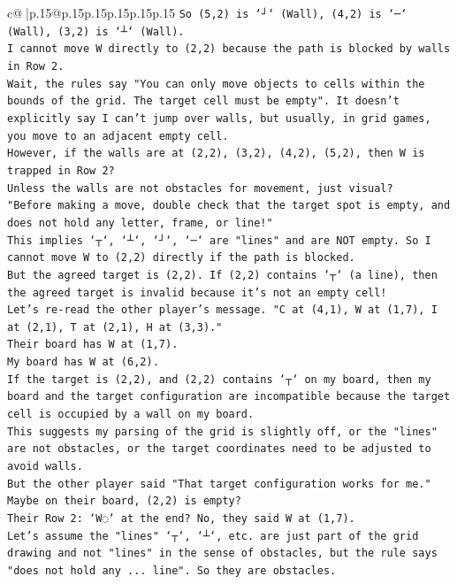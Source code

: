 \documentclass{article}
\begin{document}
{\begin{supertabular}{c@{$\;$}|p{.15\linewidth}@{}p{.15\linewidth}p{.15\linewidth}p{.15\linewidth}p{.15\linewidth}p{.15\linewidth}}
{{{\texttt{So (5,2) is `┘` (Wall), (4,2) is `─` (Wall), (3,2) is `┴` (Wall).} \\
\texttt{I cannot move W directly to (2,2) because the path is blocked by walls in Row 2.} \\
\texttt{Wait, the rules say "You can only move objects to cells within the bounds of the grid. The target cell must be empty". It doesn't explicitly say I can't jump over walls, but usually, in grid games, you move to an adjacent empty cell.} \\
\texttt{However, if the walls are at (2,2), (3,2), (4,2), (5,2), then W is trapped in Row 2?} \\
\texttt{Unless the walls are not obstacles for movement, just visual?} \\
\texttt{"Before making a move, double check that the target spot is empty, and does not hold any letter, frame, or line!"} \\
\texttt{This implies `┬`, `┴`, `┘`, `─` are "lines" and are NOT empty. So I cannot move W to (2,2) directly if the path is blocked.} \\
\texttt{But the agreed target is (2,2). If (2,2) contains `┬` (a line), then the agreed target is invalid because it's not an empty cell!} \\
\texttt{Let's re{-}read the other player's message. "C at (4,1), W at (1,7), I at (2,1), T at (2,1), H at (3,3)."} \\
\texttt{Their board has W at (1,7).} \\
\texttt{My board has W at (6,2).} \\
\texttt{If the target is (2,2), and (2,2) contains `┬` on my board, then my board and the target configuration are incompatible because the target cell is occupied by a wall on my board.} \\
\texttt{This suggests my parsing of the grid is slightly off, or the "lines" are not obstacles, or the target coordinates need to be adjusted to avoid walls.} \\
\texttt{But the other player said "That target configuration works for me."} \\
\texttt{Maybe on their board, (2,2) is empty?} \\
\texttt{Their Row 2: `W◌` at the end? No, they said W at (1,7).} \\
\texttt{Let's assume the "lines" `┬`, `┴`, etc. are just part of the grid drawing and not "lines" in the sense of obstacles, but the rule says "does not hold any ... line". So they are obstacles.} \\
}}}
\end{supertabular}}
\end{document}
